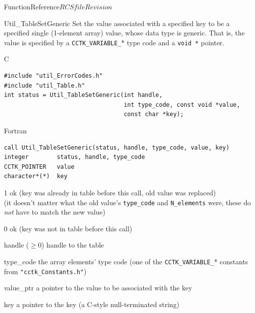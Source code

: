 \begin{cactuspart}{FunctionReference}{$RCSfile$}{$Revision$}
\begin{FunctionDescription}{Util\_TableSetGeneric}
\label{Util-TableSetGeneric}
Set the value associated with a specified key to be a specified
single (1-element array) value, whose data type is generic.  That
is, the value is specified by a \verb|CCTK_VARIABLE_|* type code
and a \verb|void *| pointer.

\begin{SynopsisSection}
\begin{Synopsis}{C}
\begin{verbatim}
#include "util_ErrorCodes.h"
#include "util_Table.h"
int status = Util_TableSetGeneric(int handle,
                                  int type_code, const void *value,
                                  const char *key);
\end{verbatim}
\end{Synopsis}
\begin{Synopsis}{Fortran}
\begin{verbatim}
call Util_TableSetGeneric(status, handle, type_code, value, key)
integer        status, handle, type_code
CCTK_POINTER   value
character*(*)  key
\end{verbatim}
\end{Synopsis}
\end{SynopsisSection}

\begin{ResultSection}
\begin{Result}{\rm 1}
ok (key was already in table before this call, old value was replaced)\\
   (it doesn't matter what the old value's \verb|type_code| and
    \verb|N_elements| were, \ie{} these do {\em not\/} have to match
    the new value)
\end{Result}
\begin{Result}{\rm 0}
ok (key was not in table before this call)
\end{Result}
\end{ResultSection}

\begin{ParameterSection}
\begin{Parameter}{handle ($\ge 0$)}
handle to the table
\end{Parameter}
\begin{Parameter}{type\_code}
the array elements' type code
(one of the \verb|CCTK_VARIABLE_|* constants from \verb|"cctk_Constants.h"|)
\end{Parameter}
\begin{Parameter}{value\_ptr}
a pointer to the value to be associated with the key
\end{Parameter}
\begin{Parameter}{key}
a pointer to the key (a C-style null-terminated string)
\end{Parameter}
\end{ParameterSection}


\end{FunctionDescription}
\end{cactuspart}
